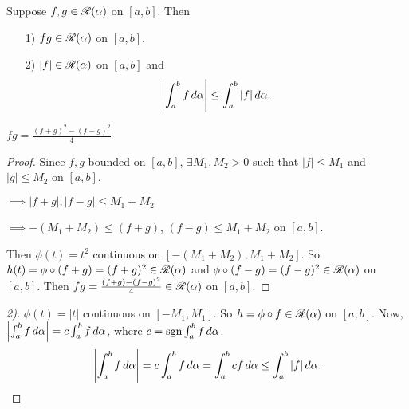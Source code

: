 \documentclass[]{article}
\begin{document}
\begin{theorem}
	\label{thm-6-13}
	Suppose $f,g\in\mathscr{R}(\alpha)$ on $[a,b]$. Then
	\begin{enumerate}
		\item[1)] $fg\in\mathscr{R}(\alpha)$ on $[a,b]$.
		\item[2)] $|f|\in\mathscr{R}(\alpha)$ on $[a,b]$ and
			$$ \left|\int_a^b f\,d\alpha\right| \leq \int_a^b |f|\,d\alpha .$$
	\end{enumerate}
\end{theorem}
\begin{recall}
	$ fg = \frac{(f+g)^2-(f-g)^2}4 $
\end{recall}
\begin{proof}
	Since $f,g$ bounded on $[a,b]$, $\exists M_1,M_2>0$ such that $|f|\leq M_1$ and $|g|\leq M_2$ on $[a,b]$.

	$\implies |f+g|, |f-g| \leq M_1+M_2$

	$\implies -(M_1+M_2) \leq (f+g)$, $(f-g) \leq M_1 + M_2$ on $[a,b]$.

	Then $\phi(t) = t^2$ continuous on $[-(M_1+M_2),M_1+M_2]$.
	So $h(t) = \phi\circ(f+g) = (f+g)^2\in\mathscr{R}(\alpha)$ and $\phi\circ(f-g)=(f-g)^2\in\mathscr{R}(\alpha)$ on $[a,b]$.
	Then $fg = \frac{(f+g)-(f-g)^2}4\in\mathscr{R}(\alpha)$ on $[a,b]$.
\end{proof}
\begin{proof}
	[2)] $\phi(t) = |t|$ continuous on $[-M_1,M_1]$.
	So $h=\phi\circ f\in\mathscr{R}(\alpha)$ on $[a,b]$.
	Now, $\left|\int_a^b f\,d\alpha\right| = c\int_a^b f\,d\alpha$, where $c = \text{sgn}\int_a^b f\,d\alpha$.
	$$ \left|\int_a^b f\,d\alpha\right| = c\int_a^b f\,d\alpha = \int_a^b cf\,d\alpha \leq \int_a^b |f|\,d\alpha. $$
\end{proof}
\end{document}

